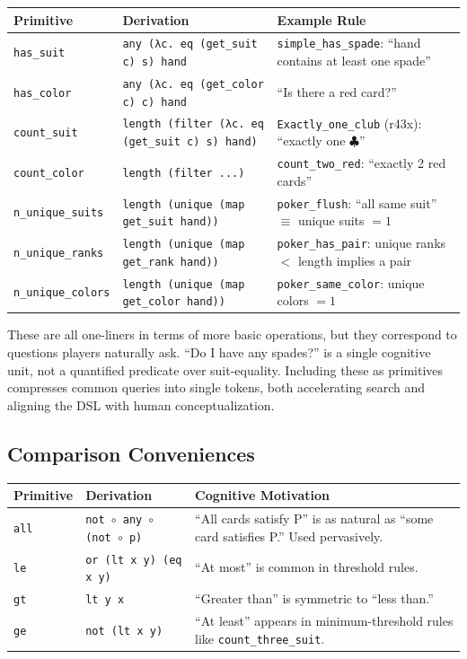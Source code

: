 \documentclass[11pt]{article}
\begin{document}
\begin{center}
\begin{tabular}{lp{5cm}p{5.5cm}}
\toprule
\textbf{Primitive} & \textbf{Derivation} & \textbf{Example Rule} \\
\midrule
\texttt{has\_suit} & \texttt{any (λc. eq (get\_suit c) s) hand} & \texttt{simple\_has\_spade}: ``hand contains at least one spade'' \\
\texttt{has\_color} & \texttt{any (λc. eq (get\_color c) c) hand} & ``Is there a red card?'' \\
\texttt{count\_suit} & \texttt{length (filter (λc. eq (get\_suit c) s) hand)} & \texttt{Exactly\_one\_club} (r43x): ``exactly one $\clubsuit$'' \\
\texttt{count\_color} & \texttt{length (filter ...)} & \texttt{count\_two\_red}: ``exactly 2 red cards'' \\
\texttt{n\_unique\_suits} & \texttt{length (unique (map get\_suit hand))} & \texttt{poker\_flush}: ``all same suit'' $\equiv$ unique suits $= 1$ \\
\texttt{n\_unique\_ranks} & \texttt{length (unique (map get\_rank hand))} & \texttt{poker\_has\_pair}: unique ranks $<$ length implies a pair \\
\texttt{n\_unique\_colors} & \texttt{length (unique (map get\_color hand))} & \texttt{poker\_same\_color}: unique colors $= 1$ \\
\bottomrule
\end{tabular}
\end{center}

These are all one-liners in terms of more basic operations, but they correspond to questions players naturally ask. ``Do I have any spades?'' is a single cognitive unit, not a quantified predicate over suit-equality. Including these as primitives compresses common queries into single tokens, both accelerating search and aligning the DSL with human conceptualization.

\subsection{Comparison Conveniences}

\begin{center}
\begin{tabular}{lp{5cm}p{6cm}}
\toprule
\textbf{Primitive} & \textbf{Derivation} & \textbf{Cognitive Motivation} \\
\midrule
\texttt{all} & \texttt{not $\circ$ any $\circ$ (not $\circ$ p)} & ``All cards satisfy P'' is as natural as ``some card satisfies P.'' Used pervasively. \\
\texttt{le} & \texttt{or (lt x y) (eq x y)} & ``At most'' is common in threshold rules. \\
\texttt{gt} & \texttt{lt y x} & ``Greater than'' is symmetric to ``less than.'' \\
\texttt{ge} & \texttt{not (lt x y)} & ``At least'' appears in minimum-threshold rules like \texttt{count\_three\_suit}. \\
\bottomrule
\end{tabular}
\end{center}
\end{document}
